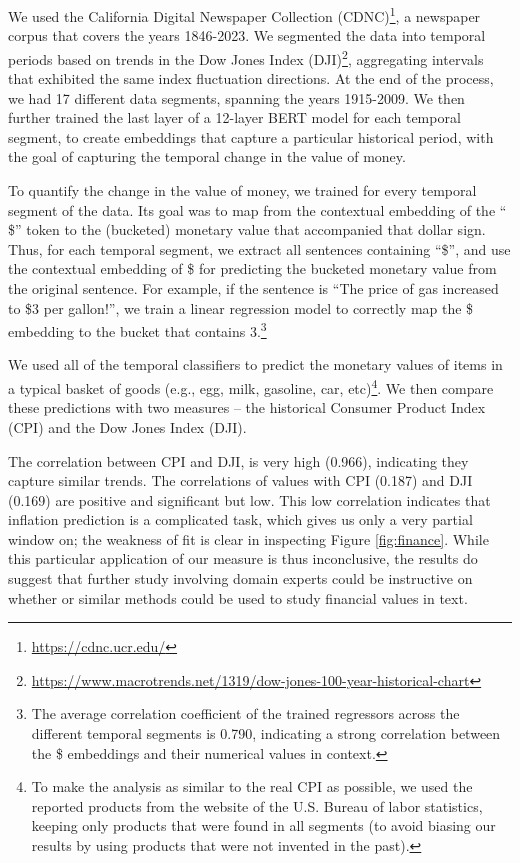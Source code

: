 We used the California Digital Newspaper Collection (CDNC)\footnote{\url{https://cdnc.ucr.edu/}}, a newspaper corpus that covers the years 1846-2023. We segmented the data into temporal periods based on trends in the Dow Jones Index (DJI)\footnote{\url{https://www.macrotrends.net/1319/dow-jones-100-year-historical-chart}}, aggregating intervals that exhibited the same index fluctuation directions. At the end of the process, we had 17 different data segments, spanning the years 1915-2009. We then further trained the last layer of a 12-layer BERT model for each temporal segment, to create embeddings that capture a particular historical period, with the goal of capturing the temporal change in the value of money.

To quantify the change in the value of money, we trained \wc for every temporal segment of the data. Its goal was to map from the contextual embedding of the `` \$'' token to the (bucketed) monetary value that accompanied that dollar sign. Thus, for each temporal segment, we extract all sentences containing ``\$'', and use the contextual embedding of \$ for predicting the bucketed monetary value from the original sentence. For example, if the sentence is ``The price of gas increased to \$3 per gallon!'', we train a linear regression model to correctly map the \$ embedding to the bucket that contains 3.\footnote{The average correlation coefficient of the trained \wc regressors across the different temporal segments is 0.790, indicating a strong correlation between the  \$ embeddings and their numerical values in context.}

We used all of the temporal \wc classifiers to predict the monetary values of items in a typical basket of goods (e.g., egg, milk, gasoline, car, etc)\footnote{To make the analysis as similar to the real CPI as possible, we used the reported products from the website of the U.S. Bureau of labor statistics, keeping only products that were found in all segments (to avoid biasing our results by using products that were not invented in the past).}.
We then compare these predictions with two measures -- the historical Consumer Product Index (CPI) and the Dow Jones Index (DJI).

The correlation between CPI and DJI, is very high (0.966), indicating they capture similar trends. The correlations of \wc values with CPI (0.187) and DJI (0.169) are positive and significant but low. This low correlation indicates that inflation prediction is a complicated task, which \wc gives us only a very partial window on; the weakness of fit is clear in inspecting Figure \ref{fig:finance}.
While this particular application of our measure is thus inconclusive, the results do suggest that further study involving domain experts could be instructive on whether \wc or similar methods could be used to study financial values in text. 

